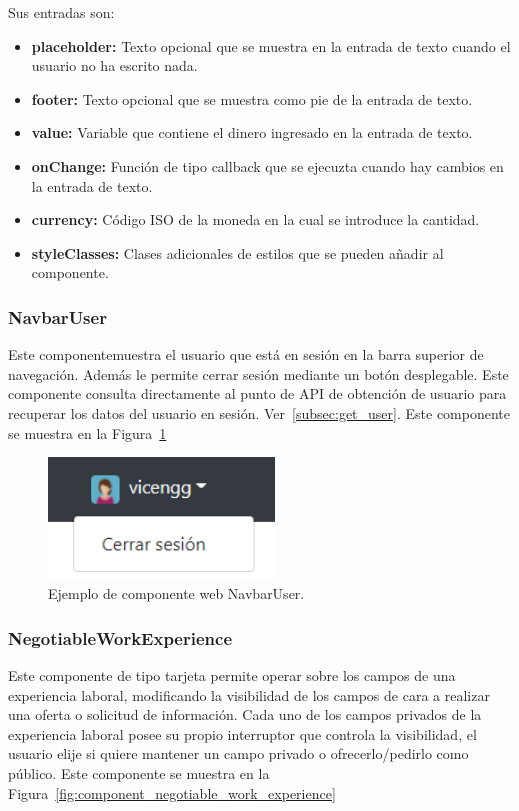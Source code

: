 \documentclass[a4paper, 12pt]{book}
\begin{document}
Sus entradas son:

		\begin{itemize}
		\item \textbf{placeholder:} Texto opcional que se muestra en la entrada de texto cuando el usuario no ha escrito nada.
		\item \textbf{footer:} Texto opcional que se muestra como pie de la entrada de texto.
		\item \textbf{value:} Variable que contiene el dinero ingresado en la entrada de texto.
		\item \textbf{onChange:} Función de tipo callback que se ejecuzta cuando hay cambios en la entrada de texto.
		\item \textbf{currency:} Código ISO de la moneda en la cual se introduce la cantidad.
		\item \textbf{styleClasses:} Clases adicionales de estilos que se pueden añadir al componente.
		\end{itemize}

\subsubsection{NavbarUser}
\label{subsec:wc_navbar_user}
Este componentemuestra el usuario que está en sesión en la barra superior de navegación.
Además le permite cerrar sesión mediante un botón desplegable.
Este componente consulta directamente al punto de API de obtención de usuario para recuperar los datos del usuario en sesión. Ver~\ref{subsec:get_user}.
Este componente se muestra en la Figura~\ref{fig:component_navbar_user}

\begin{figure}
  \centering
  \includegraphics[width=6cm, keepaspectratio]{img/NavbarUser.PNG}
  \caption{Ejemplo de componente web NavbarUser.}\label{fig:component_navbar_user}
\end{figure}

\subsubsection{NegotiableWorkExperience}
\label{subsec:wc_negotiable_work_experience}
Este componente de tipo tarjeta permite operar sobre los campos de una experiencia laboral, modificando la visibilidad de los campos de cara a realizar una oferta o solicitud de información.
Cada uno de los campos privados de la experiencia laboral posee su propio interruptor que controla la visibilidad, el usuario elije si quiere mantener un campo privado o ofrecerlo/pedirlo como público.
Este componente se muestra en la Figura~\ref{fig:component_negotiable_work_experience}
\end{document}
